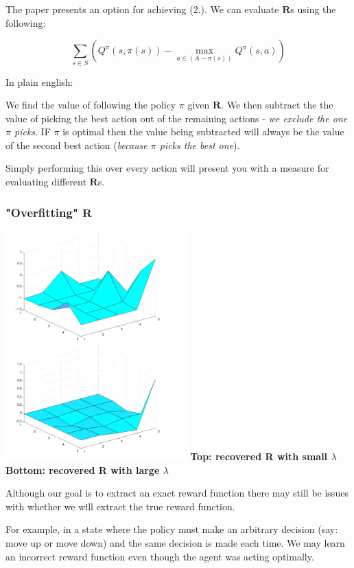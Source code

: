 \documentclass{article}
\begin{document}
    The paper presents an option for achieving (2.). We can evaluate $\mathbf{R}$s using the following:

    $$\sum_{s \in S} \left ( Q^\pi (s, \pi(s)) - \max_{a \in \left(A - \pi(s)\right)} Q^\pi (s, a) \right)$$

    
    In plain english:

    
    We find the value of following the policy $\pi$ given $\mathbf{R}$. We then subtract the the value of picking the best action out of the remaining actions - \emph{we exclude the one $\pi$ picks}.
    IF $\pi$ is optimal then the value being subtracted will always be the value of the second best action (\emph{because $\pi$ picks the best one}).
    
    Simply performing this over every action will present you with a measure for evaluating different $\mathbf{R}$s.
        
        
    \subsubsection{"Overfitting" $\mathbf{R}$}

    \includegraphics[width=7cm]{fig2.png}
        \textbf{Top: recovered R with small $\lambda$ Bottom: recovered R with large $\lambda$}
    


    Although our goal is to extract an exact reward function there may still be issues with whether we will extract the true reward function.
    
    For example, in a state where the policy must make an arbitrary decision (say: move up or move down) and the same decision is made each time. We may learn an incorrect reward function even though the agent was acting optimally.
\end{document}
